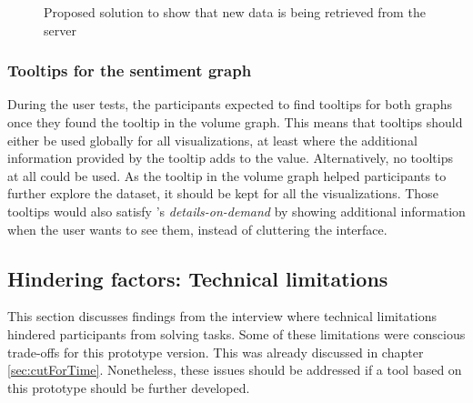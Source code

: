 \begin{figure}[htb]
    \caption{Proposed solution to show that new data is being retrieved from the server}
    \label{fig:fetching_state}
\end{figure}

\subsubsection*{Tooltips for the sentiment graph}
During the user tests, the participants expected to find tooltips for both graphs once they found the tooltip in the volume graph. This means that tooltips should either be used globally for all visualizations, at least where the additional information provided by the tooltip adds to the value. Alternatively, no tooltips at all could be used. As the tooltip in the volume graph helped participants to further explore the dataset, it should be kept for all the visualizations. Those tooltips would also satisfy \citeauthor{shneidermanEyesHaveIt1996}'s \emph{details-on-demand} by showing additional information when the user wants to see them, instead of cluttering the interface.

\subsection{Hindering factors: Technical limitations}
This section discusses findings from the interview where technical limitations hindered participants from solving tasks. Some of these limitations were conscious trade-offs for this prototype version. This was already discussed in chapter \ref{sec:cutForTime}. Nonetheless, these issues should be addressed if a tool based on this prototype should be further developed.

